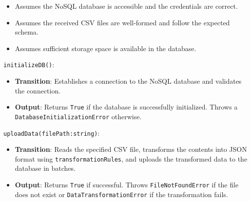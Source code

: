 \documentclass[12pt, titlepage]{article}
\begin{document}
\begin{description}
\begin{description}
  \item[Assumptions:]
  \item
  \begin{itemize}
    \item Assumes the NoSQL database is accessible and the credentials are correct.
  \end{itemize}
  \item
  \begin{itemize}
    \item Assumes the received CSV files are well-formed and follow the expected schema.
  \end{itemize}
  \item 
  \begin{itemize}
    \item Assumes sufficient storage space is available in the database.
  \end{itemize}
  \item 

  \item[Access Routine Semantics:] 
  \item
  \texttt{initializeDB()}:
  \item
  \begin{itemize}
    \item \textbf{Transition}: Establishes a connection to the NoSQL database and validates
    the connection.
  \end{itemize}
  \item
  \begin{itemize}
    \item \textbf{Output}: Returns \texttt{True} if the database is successfully initialized.
    Throws a\\ \texttt{DatabaseInitializationError} otherwise.
  \end{itemize}
  \item 

  \texttt{uploadData(filePath:string)}:
  \item
  \begin{itemize}
    \item \textbf{Transition}: Reads the specified CSV file, transforms the contents into
    JSON format using \texttt{transformationRules}, and uploads the transformed data to
    the database in batches.
  \end{itemize}
  \item
  \begin{itemize}
    \item \textbf{Output}: Returns \texttt{True} if successful. Throws \texttt{FileNotFoundError}
    if the file does not exist or \texttt{DataTransformationError} if the transformation fails.
  \end{itemize}
  \item



\end{description}
\end{description}
\end{document}
